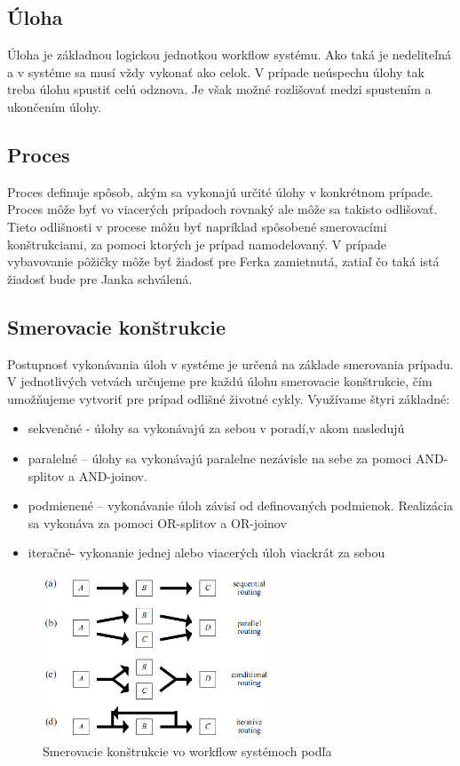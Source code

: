 \subsection{Úloha}
Úloha je základnou logickou jednotkou workflow systému. Ako taká je nedeliteľná a v systéme sa musí vždy vykonať ako celok. V prípade neúspechu úlohy tak treba úlohu spustiť celú odznova. Je však možné rozlišovať medzi spustením a ukončením úlohy. 

\subsection{Proces}
Proces definuje spôsob, akým sa vykonajú určité úlohy v konkrétnom prípade. Proces môže byť vo viacerých prípadoch rovnaký ale môže sa takisto odlišovať. Tieto odlišnosti v procese môžu byť napríklad spôsobené smerovacími konštrukciami, za pomoci ktorých je prípad namodelovaný. V prípade vybavovanie pôžičky môže byť žiadosť pre Ferka zamietnutá, zatiaľ čo taká istá žiadosť bude pre Janka schválená.

\subsection{Smerovacie konštrukcie}
	Postupnosť vykonávania  úloh v systéme je určená na základe smerovania prípadu. V jednotlivých vetvách určujeme pre každú úlohu smerovacie konštrukcie, čím umožňujeme vytvoriť  pre prípad odlišné životné cykly. Využívame štyri základné: 
\begin{itemize}
	\item sekvenčné - úlohy sa vykonávajú za sebou v poradí,v akom nasledujú
	\item paralelné – úlohy sa vykonávajú paralelne nezávisle na sebe za pomoci AND-splitov a AND-joinov.
	\item podmienené – vykonávanie úloh závisí od definovaných podmienok. Realizácia sa vykonáva za pomoci OR-splitov a OR-joinov
	\item iteračné- vykonanie jednej alebo viacerých úloh viackrát za sebou
\end{itemize}

\begin{figure}[h]
	\centerline{\includegraphics[width=0.6\textwidth]{images/smerovacie_konstrukcie}}
	\caption[smerovacie konštrukcie]{Smerovacie konštrukcie vo workflow systémoch podľa \cite{workflow_systemy}}
	\label{obr:cursus}
\end{figure}

